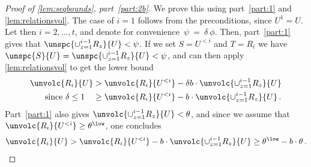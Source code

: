  \begin{proof}[Proof of \cref{lem:seqbounds}, part~\eqref{part:2b}]
 	We prove this using part~\eqref{part:1} and \cref{lem:relationsvol}. The case of $i=1$ follows from the preconditions, since $U^1=U$. Let then $i =2, \dots, t$, and denote for convenience~$\psi~=~\delta~\phi$. Then, part~\eqref{part:1} gives that $\unspc{\cup_{z=1}^{i-1} R_z}{U} < \psi$. If we set $S=U^{<i}$ and $T=R_i$ we have $\unspc{S}{U} = \unspc{\cup_{z=1}^{i-1} R_z}{U} < \psi$, and can then apply \cref{lem:relationsvol} to get the lower bound
	\begin{align*}
		\unvolc{R_i}{U} & > \unvolc{R_i}{U^{<i}} - \delta b \cdot \unvolc{\cup_{z=1}^{i-1} R_z}{U} \\
		\text{since $\delta \le 1$} \quad & \ge  \unvolc{R_i}{U^{<i}} - b \cdot \unvolc{\cup_{z=1}^{i-1} R_z}{U} \, .
	\end{align*}
	Part~\eqref{part:1} also gives $\unvolc{\cup_{z=1}^{i-1} R_z}{U} < \theta $, and since we assume that $ \unvolc{R_i}{U^{<i}} \ge \theta^{\low}$, one concludes
		\begin{equation*}
		\unvolc{R_i}{U} > \unvolc{R_i}{U^{<i}} - b \cdot \unvolc{\cup_{z=1}^{i-1} R_z}{U}  \ge \theta^{\low} - b\cdot \theta \, .
	\end{equation*}
\end{proof}

